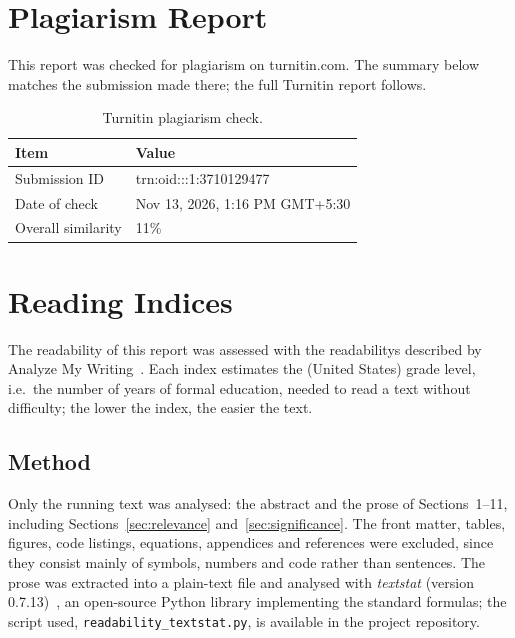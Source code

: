 \documentclass[12pt,a4paper,twoside]{article}
\begin{document}
\clearpage
\printnoidxglossary[title=Glossary]

\clearpage
\appendix

\section{Plagiarism Report}
\label{app:plagiarism}

This report was checked for plagiarism on turnitin.com. The summary below matches
the submission made there; the full Turnitin report follows.

\begin{table}[H]
\centering
\caption{Turnitin plagiarism check.}
\label{tab:plagiarism}
\begin{tabular}{@{}ll@{}}
\toprule
\textbf{Item} & \textbf{Value} \\
\midrule
Submission ID      & trn:oid:::1:3710129477\\
Date of check      & Nov 13, 2026, 1:16 PM GMT+5:30\\
Overall similarity & 11\%\\
\bottomrule
\end{tabular}
\end{table}


\clearpage
\section{Reading Indices}
\label{app:readability}

The readability of this report was assessed with the
\glspl{readability} described by Analyze My
Writing~\cite{amw}. Each index estimates the (United States) grade level, i.e.\ the
number of years of formal education, needed to read a text without difficulty; the
lower the index, the easier the text.

\subsection{Method}

Only the running text was analysed: the abstract and the prose of Sections~1--11,
including Sections~\ref{sec:relevance} and~\ref{sec:significance}.
The front matter, tables, figures, code listings, equations, appendices and
references were excluded, since they consist mainly of symbols, numbers and code
rather than sentences. The prose was extracted into a plain-text file and analysed
with \emph{textstat} (version 0.7.13)~\cite{textstat}, an open-source Python library
implementing the standard formulas; the script used,
\texttt{readability\_textstat.py}, is available in the project repository.
\end{document}
